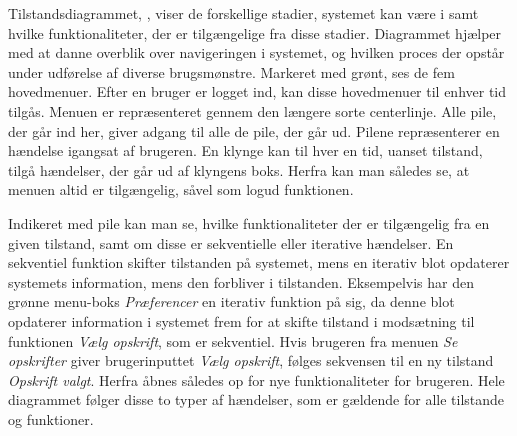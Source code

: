 Tilstandsdiagrammet, , viser de forskellige stadier, systemet kan være i samt hvilke funktionaliteter, der er tilgængelige fra disse stadier.
Diagrammet hjælper med at danne overblik over navigeringen i systemet, og hvilken proces der opstår under udførelse af diverse brugsmønstre.
Markeret med grønt, ses de fem hovedmenuer.
Efter en bruger er logget ind, kan disse hovedmenuer til enhver tid tilgås.
Menuen er repræsenteret gennem den længere sorte centerlinje.
Alle pile, der går ind her, giver adgang til alle de pile, der går ud.
Pilene repræsenterer en hændelse igangsat af brugeren.
En klynge kan til hver en tid, uanset tilstand, tilgå hændelser, der går ud af klyngens boks.
Herfra kan man således se, at menuen altid er tilgængelig, såvel som logud funktionen.

Indikeret med pile kan man se, hvilke funktionaliteter der er tilgængelig fra en given tilstand, samt om disse er sekventielle eller iterative hændelser.
En sekventiel funktion skifter tilstanden på systemet, mens en iterativ blot opdaterer systemets information, mens den forbliver i tilstanden.
Eksempelvis har den grønne menu-boks \textit{Præferencer} en iterativ funktion på sig, da denne blot opdaterer information i systemet frem for at skifte tilstand i modsætning til funktionen \textit{Vælg opskrift}, som er sekventiel.
Hvis brugeren fra menuen \textit{Se opskrifter} giver brugerinputtet \textit{Vælg opskrift}, følges sekvensen til en ny tilstand \textit{Opskrift valgt}. 
Herfra åbnes således op for nye funktionaliteter for brugeren.
Hele diagrammet følger disse to typer af hændelser, som er gældende for alle tilstande og funktioner.
